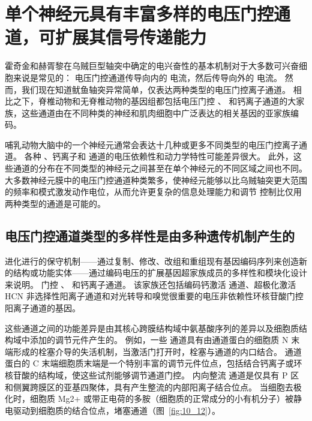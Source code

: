 \section{单个神经元具有丰富多样的电压门控通道，可扩展其信号传递能力}

霍奇金和赫胥黎在乌贼巨型轴突中确定的电兴奋性的基本机制对于大多数可兴奋细胞来说是常见的：
电压门控通道传导向内的  电流，然后传导向外的  电流。
然而，我们现在知道鱿鱼轴突异常简单，仅表达两种类型的电压门控离子通道。
相比之下，脊椎动物和无脊椎动物的基因组都包括电压门控 、 和钙离子通道的大家族，这些通道由在不同种类的神经和肌肉细胞中广泛表达的相关基因的亚家族编码。


哺乳动物大脑中的一个神经元通常会表达十几种或更多不同类型的电压门控离子通道。
各种 、钙离子和  通道的电压依赖性和动力学特性可能差异很大。
此外，这些通道的分布在不同类型的神经元之间甚至在单个神经元的不同区域之间也不同。
大多数神经元膜中的电压门控通道种类繁多，使神经元能够以比乌贼轴突更大范围的频率和模式激发动作电位，从而允许更复杂的信息处理能力和调节 控制比仅用两种类型的通道是可能的。



\subsection{电压门控通道类型的多样性是由多种遗传机制产生的}

进化进行的保守机制——通过复制、修改、改组和重组现有基因编码序列来创造新的结构或功能实体——通过编码电压的扩展基因超家族成员的多样性和模块化设计来说明。 
门控 、 和钙离子通道。
该家族还包括编码钙激活  通道、超极化激活 HCN 非选择性阳离子通道和对光转导和嗅觉很重要的电压非依赖性环核苷酸门控阳离子通道的基因。


这些通道之间的功能差异是由其核心跨膜结构域中氨基酸序列的差异以及细胞质结构域中添加的调节元件产生的。 
例如，一些  通道具有由通道蛋白的细胞质 N 末端形成的栓塞介导的失活机制，当激活门打开时，栓塞与通道的内口结合。
通道蛋白的 C 末端细胞质末端是一个特别丰富的调节元件位点，包括结合钙离子或环核苷酸的结构域，使这些试剂能够调节通道门控。
内向整流  通道是仅具有 P 区和侧翼跨膜区的亚基四聚体，具有产生整流的内部阳离子结合位点。
当细胞去极化时，细胞质 Mg2+ 或带正电荷的多胺（细胞质的正常成分的小有机分子）被静电驱动到细胞质的结合位点，堵塞通道（图~\ref{fig:10_12}）。


